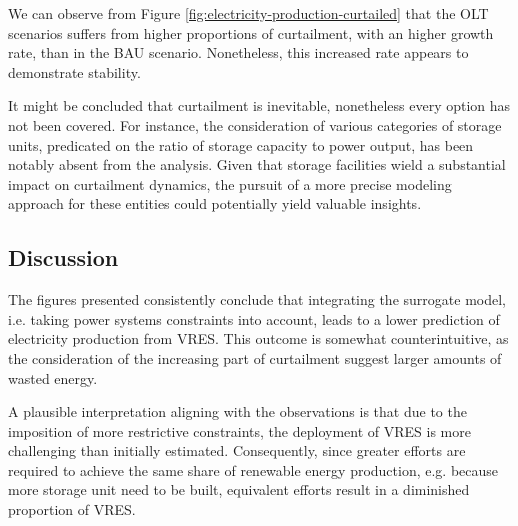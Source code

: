 We can observe from Figure \ref{fig:electricity-production-curtailed} that the OLT scenarios suffers from higher proportions of curtailment, with an higher growth rate, than in the BAU scenario. Nonetheless, this increased rate appears to demonstrate stability.

It might be concluded that curtailment is inevitable, nonetheless every option has not been covered. For instance, the consideration of various categories of storage units, predicated on the ratio of storage capacity to power output, has been notably absent from the analysis. Given that storage facilities wield a substantial impact on curtailment dynamics, the pursuit of a more precise modeling approach for these entities could potentially yield valuable insights.

\subsection{Discussion}

The figures presented consistently conclude that integrating the surrogate model, i.e. taking power systems constraints into account, leads to a lower prediction of electricity production from VRES. This outcome is somewhat counterintuitive, as the consideration of the increasing part of curtailment suggest larger amounts of wasted energy.

A plausible interpretation aligning with the observations is that due to the imposition of more restrictive constraints, the deployment of VRES is more challenging than initially estimated. Consequently, since greater efforts are required to achieve the same share of renewable energy production, e.g. because more storage unit need to be built, equivalent efforts result in a diminished proportion of VRES.


